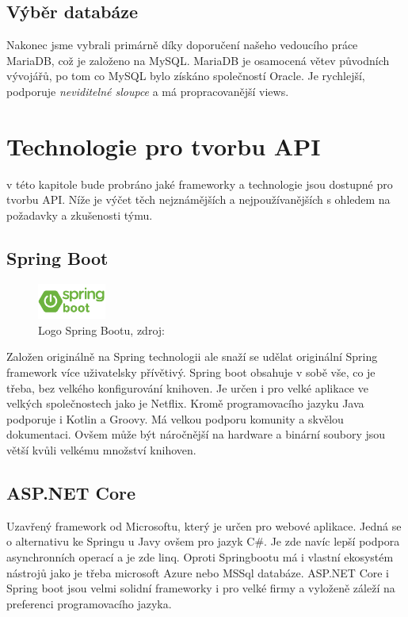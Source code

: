 \subsection{Výběr databáze}
Nakonec jsme vybrali primárně díky doporučení našeho vedoucího práce MariaDB, což je založeno na MySQL. MariaDB je osamocená větev původních vývojářů, po tom co MySQL bylo získáno společností Oracle. Je rychlejší, podporuje \textit{neviditelné sloupce} a má propracovanější views.

\section{Technologie pro tvorbu API}\label{sec:api_technologies}
v této kapitole bude probráno jaké frameworky a technologie jsou dostupné pro tvorbu API. Níže je výčet těch nejznámějších a nejpoužívanějších s ohledem na požadavky a zkušenosti týmu.

\subsection{Spring Boot}\label{sec:api_technologies:spring}
\begin{figure} %
    \centering
    \includegraphics[width=0.2\textwidth]{figures/logos/springboot.png}
    \caption{Logo Spring Bootu, zdroj: } %
    \label{fig:spring}
\end{figure}
Založen originálně na Spring technologii ale snaží se udělat originální Spring framework více uživatelsky přívětivý. Spring boot obsahuje v sobě vše, co je třeba, bez velkého konfigurování knihoven. Je určen i pro velké aplikace ve velkých společnostech jako je Netflix. Kromě programovacího jazyku Java podporuje i Kotlin a Groovy. Má velkou podporu komunity a skvělou dokumentaci. Ovšem může být náročnější na hardware a binární soubory jsou větší kvůli velkému množství knihoven.

\subsection{ASP.NET Core}\label{sec:api_technologies:asp}
Uzavřený framework od Microsoftu, který je určen pro webové aplikace. Jedná se o alternativu ke Springu u Javy ovšem pro jazyk C\#. Je zde navíc lepší podpora asynchronních operací a je zde \gls{linq}. Oproti Springbootu má i vlastní ekosystém nástrojů jako je třeba microsoft Azure nebo MSSql databáze. ASP.NET Core i Spring boot jsou velmi solidní frameworky i pro velké firmy a vyloženě záleží na preferenci programovacího jazyka.

